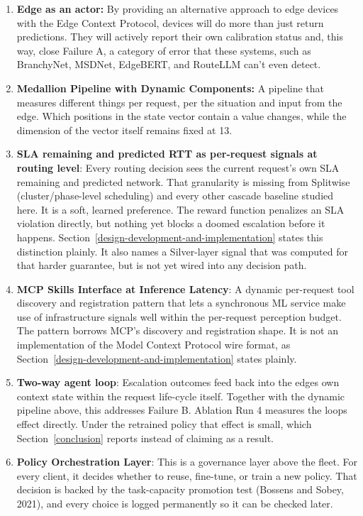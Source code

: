 \begin{enumerate}
\def\labelenumi{\arabic{enumi}.}
\item \textbf{Edge as an actor:} By providing an alternative approach
to edge devices with the Edge Context Protocol, devices will do more
than just return predictions. They will actively report their own
calibration status and, this way, close Failure A, a category of
error that these systems, such as BranchyNet, MSDNet, EdgeBERT, and
RouteLLM can't even detect.
\item \textbf{Medallion Pipeline with Dynamic Components:} A pipeline
that measures different things per request, per the situation and
input from the edge. Which positions in the state vector contain a
value changes, while the dimension of the vector itself remains fixed
at 13.
\item \textbf{SLA remaining and predicted RTT as per-request signals at
routing level}: Every routing decision sees the current request's own
SLA remaining and predicted network. That granularity is missing from Splitwise (cluster/phase-level
scheduling) and every other cascade baseline studied here. It is a soft,
learned preference. The reward function penalizes an SLA violation
directly, but nothing yet blocks a doomed escalation before it happens.
Section~\ref{design-development-and-implementation} states this distinction plainly. It also names a Silver-layer
signal that was computed for that harder guarantee, but is not yet wired
into any decision path.
\item \textbf{MCP Skills Interface at Inference Latency}: A dynamic
per-request tool discovery and registration pattern that lets a
synchronous ML service make use of infrastructure signals well within
the per-request perception budget. The pattern borrows MCP's discovery
and registration shape. It is not an implementation of the Model Context
Protocol wire format, as Section~\ref{design-development-and-implementation} states plainly.
\item \textbf{Two-way agent loop}: Escalation outcomes feed back into
the edge\textquotesingle s own context state within the request
life-cycle itself. Together with the dynamic
pipeline above, this addresses Failure B. Ablation Run 4 measures the
loop\textquotesingle s effect directly. Under the retrained policy that
effect is small, which Section~\ref{conclusion} reports instead of claiming as a result.
\item \textbf{Policy Orchestration Layer}: This is a governance layer
above the fleet. For every client, it decides whether to reuse,
fine-tune, or train a new policy. That decision is backed by the
task-capacity promotion test (Bossens and Sobey, 2021), and every choice
is logged permanently so it can be checked later.
\end{enumerate}
